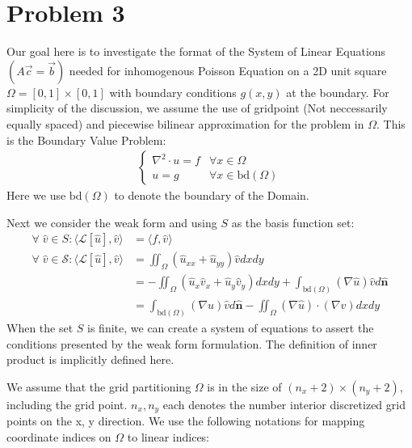 \documentclass[]{article}
\begin{document}
\section*{Problem 3}
    \hspace{1.1em}
    Our goal here is to investigate the format of the System of Linear Equations $(A\vec{c} = \vec{b})$ needed for inhomogenous Poisson Equation on a 2D unit square $\Omega = [0, 1]\times [0, 1]$ with boundary conditions $g(x,y)$ at the boundary. For simplicity of the discussion, we assume the use of gridpoint (Not neccessarily equally spaced) and piecewise bilinear approximation for the problem in $\Omega$. This is the Boundary Value Problem: 
    \begin{align*}\tag{3.1}\label{eqn:3.1}
        \begin{cases}
            \nabla^2\cdot u = f &\forall x \in \Omega
            \\
            u = g & \forall x \in \text{bd}(\Omega)
        \end{cases}
    \end{align*}
    Here we use $\text{bd}(\Omega)$ to denote the boundary of the Domain.
    \par
    Next we consider the weak form and using $S$ as the basis function set: 
    \begin{align*}\tag{3.2}\label{eqn:3.2}
        \forall\; \hat{v}\in S: \langle \mathcal{L}[\hat{u}], \hat{v}\rangle &= \langle 
	    f, \hat{v}
        \rangle
        \\
        \forall\; \hat{v} \in \mathcal{S}:
        \langle \mathcal{L}[\hat{u}], \hat{v}\rangle
        &= 
        \iint_{\Omega}(\hat{u}_{xx} + \hat{u}_{yy})\hat{v}dxdy
        \\
        &= - \iint_{\Omega}(\hat{u}_x\hat{v}_x + \hat{u}_y \hat{v}_y)dxdy 
        +
        \int_{\text{bd}(\Omega)} (\nabla \hat{u})\hat{v} d\hat{\mathbf{n}}
        \\
        &= 
        \int_{\text{bd}(\Omega)} (\nabla u)\hat{v} d\hat{\mathbf{n}} - 
        \iint_{\Omega} (\nabla \hat{u})\cdot (\nabla \hat{v})dxdy
    \end{align*}
    When the set $S$ is finite, we can create a system of equations to assert the conditions presented by the weak form formulation. The definition of inner product is implicitly defined here. 
    \par
    We assume that the grid partitioning $\Omega$ is in the size of $(n_x + 2)\times(n_y + 2)$, including the grid point. $n_x, n_y$ each denotes the number interior discretized grid points on the x, y direction. We use the following notations for mapping coordinate indices on $\Omega$ to linear indices: 
\end{document}
